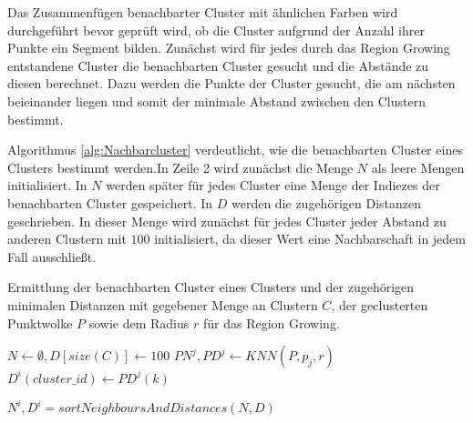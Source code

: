 Das Zusammenfügen benachbarter Cluster mit ähnlichen Farben wird durchgeführt bevor geprüft wird, ob die Cluster aufgrund der Anzahl ihrer Punkte ein Segment bilden. Zunächst wird für jedes durch das Region Growing entstandene Cluster die benachbarten Cluster gesucht und die Abstände zu diesen berechnet. Dazu werden die Punkte der Cluster gesucht, die am nächsten beieinander liegen und somit der minimale Abstand zwischen den Clustern bestimmt.

Algorithmus \ref{alg:Nachbarcluster} verdeutlicht, wie die benachbarten Cluster eines Clusters bestimmt werden.In Zeile 2 wird zunächst die Menge $N$ als leere Mengen initialisiert. In $N$ werden später für jedes Cluster eine Menge der Indiezes der benachbarten Cluster gespeichert. In $D$ werden die zugehörigen Distanzen geschrieben. In dieser Menge wird zunächst für jedes Cluster jeder Abstand zu anderen Clustern mit $100$  initialisiert, da dieser Wert eine Nachbarschaft in jedem Fall ausschließt.

\begin{algorithm}
	\caption{Ermittlung der benachbarten Cluster eines Clusters und der zugehörigen minimalen Distanzen mit gegebener Menge an Clustern $C$, der geclusterten Punktwolke $P$ sowie dem Radius $r$ für das Region Growing.}
	\label{alg:Nachbarcluster}
	\begin{algorithmic}[1]
			\State $ N \leftarrow \emptyset, D[size(C)] \leftarrow 100 $ 
					\State $PN^j,PD^j \leftarrow KNN(P,p_j,r) $
								\State $ D^i(cluster\_id) \leftarrow PD^j(k) $
							\EndIf
						\EndIf
				
					\EndFor	
				\EndFor	
				\State $ N^i,D^i = sortNeighboursAndDistances(N,D) $ 
			\EndFor
			\State {}
		\EndFunction
	\end{algorithmic}
\end{algorithm}


